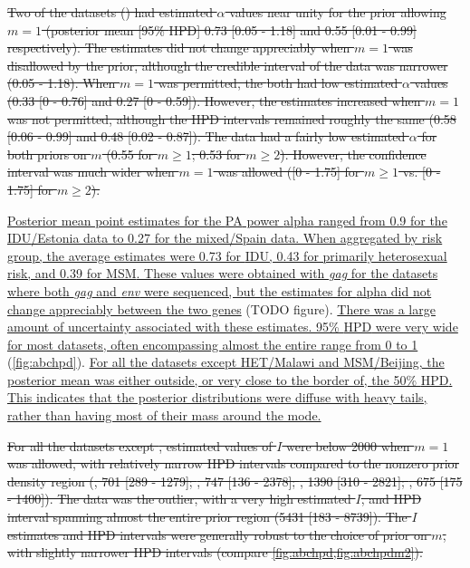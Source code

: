 {\color{red}\sout{
Two of the datasets (\textcite{niculescu2015recent, wang2015targeting}) had
estimated $\alpha$ values near unity for the prior allowing $m = 1$ (posterior
mean [95\% \gls{HPD}] 
  0.73 
  [0.05 - 
   1.18]
and
  0.55 
  [0.01 -
   0.99] respectively).
The estimates did not change appreciably when $m = 1$ was disallowed by the
prior, although the credible interval of the \textcite{niculescu2015recent}
data was narrower
  (0.05 - 
   1.18).
When $m = 1$ was permitted, the \textcite{li2015hiv, cuevas2009hiv} both had
low estimated $\alpha$ values
  (0.33 
  [0 - 
  0.76]
and
  0.27 
  [0 -
   0.59]). 
However, the estimates increased when $m = 1$ was not permitted, although the
HPD intervals remained roughly the same
  (0.58 
  [0.06 - 
  0.99]
and
  0.48 
  [0.02 -
   0.87]).
The \textcite{novitsky2014impact} data had a fairly low estimated $\alpha$
for both priors on $m$
  (0.55 for $m \geq 1$;
   0.53 for $m \geq 2$).
However, the confidence interval was much wider when $m = 1$ was allowed
  ([0 -
    1.75] for $m \geq 1$ vs.
   [0 -
    1.75] for $m \geq 2$). }}

{\color{blue}\uline{Posterior mean point estimates for the \acrlong{PA} power
\gls{alpha} ranged from 
    0.9
for the \gls{IDU}/Estonia data to
    0.27
for the mixed/Spain data. When aggregated by risk group, the average estimates
were
    0.73
for \gls{IDU},
    0.43
for primarily heterosexual risk, and
    0.39
for \gls{MSM}. These values were obtained with \textit{gag} for the datasets
where both \textit{gag} and \textit{env} were sequenced, but the estimates for
\gls{alpha} did not change appreciably between the two genes} (TODO figure).
\uline{There was a large amount of uncertainty associated with these
estimates. 95\% \gls{HPD} were very wide for most datasets, often encompassing
almost the entire range from 0 to 1} (\cref{fig:abchpd}). \uline{For all the
datasets except HET/Malawi and MSM/Beijing, the posterior mean was either
outside, or very close to the border of, the 50\% \gls{HPD}. This indicates
that the posterior distributions were diffuse with heavy tails, rather than
having most of their mass around the mode.}}

{\color{red}\sout{For all the datasets except \citeauthor{novitsky2014impact},
estimated values of $I$ were below 2000 when $m = 1$ was allowed, with
relatively narrow HPD intervals compared to the nonzero prior density region
  (\citeauthor{cuevas2009hiv}, 701 
  [289 -
   1279];
   \citeauthor{niculescu2015recent}, 747
  [136 - 
   2378];
  \citeauthor{li2015hiv}, 1390 
  [310 -
   2821];
   \citeauthor{wang2015targeting}, 675
  [175 - 
   1400]).
The \citeauthor{novitsky2014impact} data was the outlier, with a very high
estimated $I$, and HPD interval spanning almost the entire prior region
  (5431 
  [183 -
   8739]).
The $I$ estimates and HPD intervals were generally robust to the choice of
prior on $m$, with slightly narrower HPD intervals (compare
\cref{fig:abchpd,fig:abchpdm2}).}}

